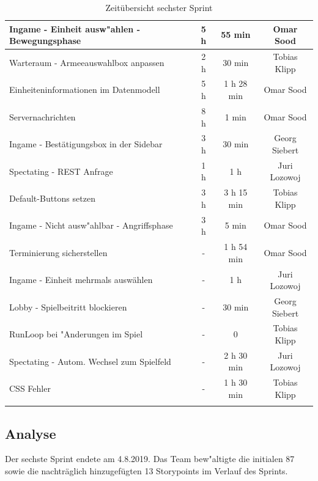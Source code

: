 \documentclass[12pt, titlepage]{scrartcl}
\begin{document}
\begin{longtable}[H]{p{9cm} c c c }
    			Ingame - Einheit ausw"ahlen - Bewegungsphase & 5 h & 55 min & Omar Sood \\
    			\midrule
    			Warteraum - Armeeauswahlbox anpassen & 2 h & 30 min & Tobias Klipp \\
    			Einheiteninformationen im Datenmodell & 5 h & 1 h 28 min & Omar Sood \\
    			Servernachrichten & 8 h & 1 min & Omar Sood \\
    			Ingame - Best\"atigungsbox in der Sidebar & 3 h & 30 min & Georg Siebert \\
    			Spectating - REST Anfrage & 1 h & 1 h & Juri Lozowoj \\
    			Default-Buttons setzen & 3 h & 3 h 15 min & Tobias Klipp \\
    			Ingame - Nicht ausw"ahlbar - Angriffsphase & 3 h & 5 min & Omar Sood \\
    			\midrule
    			Terminierung sicherstellen & - & 1 h 54 min & Omar Sood \\
    			Ingame - Einheit mehrmals ausw\"ahlen & - & 1 h & Juri Lozowoj \\
    			Lobby - Spielbeitritt blockieren & - & 30 min & Georg Siebert \\
    			RunLoop bei "Anderungen im Spiel & - & 0 & Tobias Klipp \\
    			Spectating - Autom. Wechsel zum Spielfeld & - & 2 h 30 min & Juri Lozowoj \\
    			CSS Fehler & - & 1 h 30 min & Tobias Klipp \\
    			\caption{Zeit\"ubersicht sechster Sprint}
    		\end{longtable}
    	\subsection{Analyse}
    		Der sechste Sprint endete am 4.8.2019. Das Team bew"altigte die initialen 87 sowie die nachtr\"aglich hinzugef\"ugten 13 Storypoints im Verlauf des Sprints.
\end{document}
